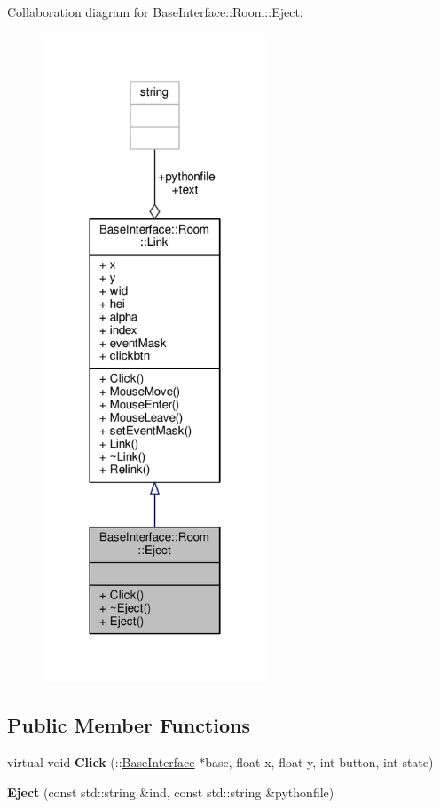 Collaboration diagram for Base\+Interface\+:\+:Room\+:\+:Eject\+:
\nopagebreak
\begin{figure}[H]
\begin{center}
\leavevmode
\includegraphics[width=190pt]{d7/da2/classBaseInterface_1_1Room_1_1Eject__coll__graph}
\end{center}
\end{figure}
\subsection*{Public Member Functions}
\begin{DoxyCompactItemize}
\item 
virtual void {\bfseries Click} (\+::\hyperlink{classBaseInterface}{Base\+Interface} $\ast$base, float x, float y, int button, int state)\hypertarget{classBaseInterface_1_1Room_1_1Eject_a4fab77c53bd7f6412d30beb094efba58}{}\label{classBaseInterface_1_1Room_1_1Eject_a4fab77c53bd7f6412d30beb094efba58}

\item 
{\bfseries Eject} (const std\+::string \&ind, const std\+::string \&pythonfile)\hypertarget{classBaseInterface_1_1Room_1_1Eject_af5079b274a041ccd3e8430e0bc6005b1}{}\label{classBaseInterface_1_1Room_1_1Eject_af5079b274a041ccd3e8430e0bc6005b1}

\end{DoxyCompactItemize}
